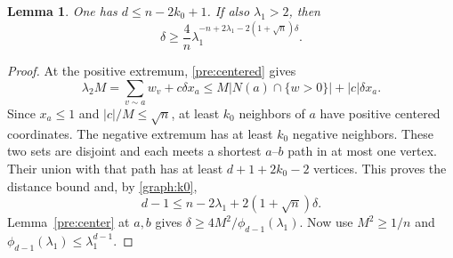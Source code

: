 \documentclass[11pt,a4paper]{article}
\numberwithin{equation}{section}
\newtheorem{lemma}[theorem]{Lemma}
\theoremstyle{definition}
\theoremstyle{remark}
\begin{document}
\begin{lemma}\label{graph:neighborhoods}
One has $d\le n-2k_0+1$. If also $\lambda_1>2$, then
\begin{equation}\label{graph:universal}
 \delta\ge\frac4n\lambda_1^{-n+2\lambda_1-2(1+\sqrt n)\delta}.
\end{equation}
\end{lemma}
\begin{proof}
At the positive extremum, \eqref{pre:centered} gives
\[
 \lambda_2M=\sum_{v\sim a}w_v+c\delta x_a
 \le M|N(a)\cap\{w>0\}|+|c|\delta x_a.
\]
Since $x_a\le1$ and $|c|/M\le\sqrt n$, at least $k_0$ neighbors of
$a$ have positive centered coordinates. The negative extremum has at
least $k_0$ negative neighbors. These two sets are disjoint and each
meets a shortest $a$--$b$ path in at most one vertex. Their union with
that path has at least $d+1+2k_0-2$ vertices. This proves the distance
bound and, by \eqref{graph:k0},
\[
 d-1\le n-2\lambda_1+2(1+\sqrt n)\delta.
\]
Lemma~\ref{pre:center} at $a,b$ gives
$\delta\ge4M^2/\phi_{d-1}(\lambda_1)$. Now use $M^2\ge1/n$ and
$\phi_{d-1}(\lambda_1)\le\lambda_1^{d-1}$.
\end{proof}
\end{document}
